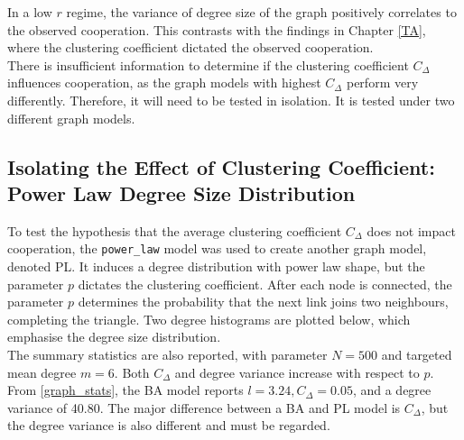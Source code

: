 In a low $r$ regime, the variance of degree size of the graph positively correlates to the observed cooperation. This contrasts with the findings in Chapter \ref{TA}, where the clustering coefficient dictated the observed cooperation. \\

There is insufficient information to determine if the clustering coefficient $C_\Delta$ influences cooperation, as the graph models with highest $C_\Delta$ perform very differently. Therefore, it will need to be tested in isolation. It is tested under two different graph models. \\

\subsection{Isolating the Effect of Clustering Coefficient: Power Law Degree Size Distribution}
To test the hypothesis that the average clustering coefficient $C_\Delta$ does not impact cooperation, the \verb+power_law+ model was used to create another graph model, denoted PL. It induces a degree distribution with power law shape, but the parameter $p$ dictates the clustering coefficient. After each node is connected, the parameter $p$ determines the probability that the next link joins two neighbours, completing the triangle. Two degree histograms are plotted below, which emphasise the degree size distribution. \\
\FloatBarrier
{}
\FloatBarrier
{}
\FloatBarrier
The summary statistics are also reported, with parameter $N = 500$ and targeted mean degree $m=6$. Both $C_\Delta$ and degree variance increase with respect to $p$. From \ref{graph_stats}, the BA model reports $l=3.24, C_\Delta = 0.05$, and a degree variance of 40.80. The major difference between a BA and PL model is $C_\Delta$, but the degree variance is also different and must be regarded.   \\
\FloatBarrier
